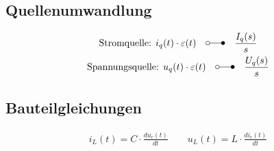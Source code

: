 \subsection{Quellenumwandlung}
\begin{gather*}
	\text{Stromquelle: }i_q(t)\cdot \varepsilon(t) \quad \laplace \quad \frac{I_q(s)}{s}\\
	\text{Spannungsquelle: }u_q(t)\cdot \varepsilon(t) \quad \laplace \quad \frac{U_q(s)}{s}
\end{gather*}
\subsection{Bauteilgleichungen}
\begin{gather*}
	i_L (t) = C \cdot \frac{du_c(t)}{dt} \qquad u_L (t) = L \cdot \frac{di_c(t)}{dt}
\end{gather*}
